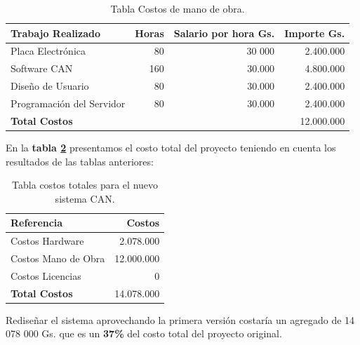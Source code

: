 \begin{table}[H]
\begin{center}
\begin{tabular}{l r r r}
\toprule
\textbf{Trabajo Realizado} & \textbf{Horas}&\textbf{Salario por hora Gs.} & \textbf{Importe Gs.} \\ 
\midrule
 Placa Electrónica & 80 & 30 000  & 2.400.000     \\ 
 Software CAN      & 160  & 30.000  & 4.800.000     \\ 
 Diseño de Usuario & 80  & 30.000  & 2.400.000     \\ 
 Programación del Servidor & 80 & 30.000 & 2.400.000 \\ 
  \textbf{Total Costos} &  &  & 12.000.000 \\ \bottomrule
\end{tabular}
\caption{Tabla Costos de mano de obra.}
\label{tabla:extra}
\end{center}
\end{table}



En la \textbf{tabla \ref{tabla:nuevototal}} presentamos el costo total del proyecto teniendo en cuenta los resultados de las tablas anteriores: 

\begin{table}[H]
\begin{center}
\begin{tabular}{l r}
\toprule
\textbf{Referencia} & \textbf{Costos}  \\ 
\midrule
Costos Hardware  & 2.078.000     \\ 
Costos Mano de Obra  & 12.000.000     \\ 
Costos Licencias &         0     \\ 
\textbf{Total Costos} & 14.078.000    \\ 
\bottomrule
\end{tabular}
\caption{Tabla costos totales para el nuevo sistema CAN.}
\label{tabla:nuevototal}
\end{center}
\end{table}

Rediseñar el sistema aprovechando la primera versión costaría un agregado de 14 078 000 Gs. que es un \textbf{37\%} del costo total del proyecto original. 